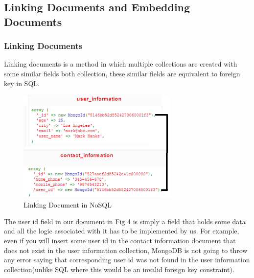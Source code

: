 \documentclass[conference]{IEEEtran}
\begin{document}
\indent
\subsection{Linking Documents and Embedding Documents}
\subsubsection{Linking Documents}
Linking documents is a method in which multiple collections are created with some similar fields both collection, these similar fields are equivalent to foreign key in SQL.
\begin{figure}[H]
    \centering
    \includegraphics[width=8cm]{linkingdocuments}
    \caption{Linking Document in NoSQL}
    \label{fig:fig4}
\end{figure}
The user id field in our document in Fig 4 is simply a field that holds some data and all the logic associated with it has to be implemented by us. For example, even if you will insert some user id in the contact information document that does not exist in the user information collection, MongoDB is not going to throw any error saying that corresponding user id was not found in the user information collection(unlike SQL where this would be an invalid foreign key constraint).
\end{document}
